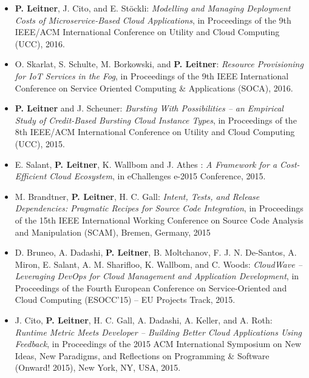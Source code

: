 \documentclass[paper=letter,fontsize=11pt]{scrartcl} %
\begin{document}
\begin{itemize}
\begin{shaded}
    \end{shaded}
	\item \textbf{P. Leitner}, J. Cito, and E. St\"ockli: \emph{Modelling and Managing Deployment Costs of Microservice-Based Cloud Applications}, in Proceedings of the 9th IEEE/ACM International Conference on Utility and Cloud Computing (UCC), 2016.
  \item O. Skarlat, S. Schulte, M. Borkowski, and \textbf{P. Leitner}: \emph{Resource Provisioning for IoT Services in the Fog}, in Proceedings of the 9th IEEE International Conference on Service Oriented Computing \& Applications (SOCA), 2016.
	\item \textbf{P. Leitner} and J. Scheuner: \emph{Bursting With Possibilities -- an Empirical Study of Credit-Based Bursting Cloud Instance Types}, in Proceedings of the 8th IEEE/ACM International Conference on Utility and Cloud Computing (UCC), 2015.
  \item E. Salant, \textbf{P. Leitner}, K. Wallbom and J. Athes : \emph{A Framework for a Cost-Efficient Cloud Ecosystem}, in eChallenges e-2015 Conference, 2015.
  \item M. Brandtner, \textbf{P. Leitner}, H. C. Gall: \emph{Intent, Tests, and Release Dependencies: Pragmatic Recipes for Source Code Integration}, in Proceedings of the 15th IEEE International Working Conference on Source Code Analysis and Manipulation (SCAM), Bremen, Germany, 2015
  \item  D. Bruneo, A. Dadashi, \textbf{P. Leitner}, B. Moltchanov, F. J. N. De-Santos, A. Miron, E. Salant, A. M. Sharifloo, K. Wallbom, and C. Woods: \emph{CloudWave – Leveraging DevOps for Cloud Management and Application Development}, in Proceedings of the Fourth European Conference on Service-Oriented and Cloud Computing (ESOCC’15) – EU Projects Track, 2015.
      \item J. Cito, \textbf{P. Leitner}, H. C. Gall, A. Dadashi, A. Keller, and A. Roth: \emph{Runtime Metric Meets Developer -- Building Better Cloud Applications Using Feedback}, in Proceedings of the 2015 ACM International Symposium on New Ideas, New Paradigms, and Reflections on Programming \& Software (Onward! 2015), New York, NY, USA, 2015.

\end{itemize}
\end{document}
